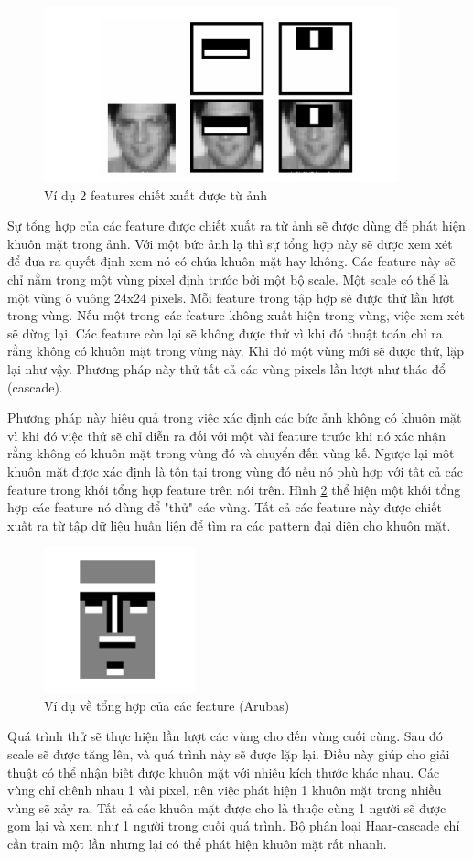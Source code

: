 \documentclass[a4paper]{report}
\begin{document}
%
\begin{figure}[H]
\centering
\includegraphics[width=.5\textwidth]{../images/fig/2-11.png}
\caption{Ví dụ 2 features chiết xuất được từ ảnh}
\label{fig:2.11}
\end{figure}
%
\noindent
Sự tổng hợp của các feature được chiết xuất ra từ ảnh sẽ được dùng để phát hiện khuôn mặt trong ảnh. Với một bức ảnh lạ thì sự tổng hợp này sẽ được xem xét để đưa ra quyết định xem nó có chứa khuôn mặt hay không. Các feature này sẽ chỉ nằm trong một vùng pixel định trước bởi một bộ scale. Một scale có thể là một vùng ô vuông 24x24 pixels. Mỗi feature trong tập hợp sẽ được thử lần lượt trong vùng. Nếu một trong các feature không xuất hiện trong vùng, việc xem xét sẽ dừng lại. Các feature còn lại sẽ không được thử vì khi đó thuật toán chỉ ra rằng không có khuôn mặt trong vùng này. Khi đó một vùng mới sẽ được thử, lặp lại như vậy. Phương pháp này thử tất cả các vùng pixels lần lượt như thác đổ (cascade).
\par\noindent
Phương pháp này hiệu quả trong việc xác định các bức ảnh không có khuôn mặt vì khi đó việc thử sẽ chỉ diễn ra đối với một vài feature trước khi nó xác nhận rằng không có khuôn mặt trong vùng đó và chuyển đến vùng kế. Ngược lại một khuôn mặt được xác định là tồn tại trong vùng đó nếu nó phù hợp với tất cả các feature trong khối tổng hợp feature trên nói trên. Hình \ref{fig:2.12} thể hiện một khối tổng hợp các feature nó dùng để "thử" các vùng. Tất cả các feature này được chiết xuất ra từ tập dữ liệu huấn liện để tìm ra các pattern đại diện cho khuôn mặt.
%
\begin{figure}[H]
\centering
\includegraphics[scale=.5]{../images/fig/2-12.png}
\caption{Ví dụ về tổng hợp của các feature (Arubas)}
\label{fig:2.12}
\end{figure}
%
\noindent
Quá trình thử sẽ thực hiện lần lượt các vùng cho đến vùng cuối cùng. Sau đó scale sẽ được tăng lên, và quá trình này sẽ được lặp lại. Điều này giúp cho giải thuật có thể nhận biết được khuôn mặt với nhiều kích thước khác nhau. Các vùng chỉ chênh nhau 1 vài pixel, nên việc phát hiện 1 khuôn mặt trong nhiều vùng sẽ xảy ra. Tất cả các khuôn mặt được cho là thuộc cùng 1 người sẽ được gom lại và xem như 1 người trong cuối quá trình. Bộ phân loại Haar-cascade chỉ cần train một lần nhưng lại có thể phát hiện khuôn mặt rất nhanh.
\end{document}
